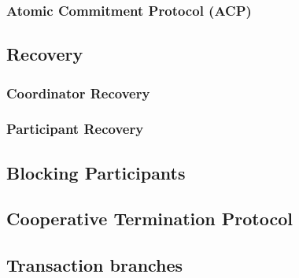 			\subsubsection{Atomic Commitment Protocol (ACP)}
			
			
		\subsection{Recovery}
			\subsubsection{Coordinator Recovery}
			
			\subsubsection{Participant Recovery}
			
			
			
		\subsection{Blocking Participants}
		
		\subsection{Cooperative Termination Protocol}
		
		\subsection{Transaction branches}
		
		
					
			
		
		
		
		
		
		
		
		
		
		
		
			
		